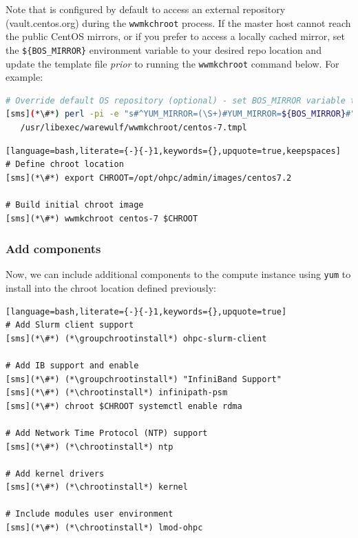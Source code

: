 \documentclass[letterpaper]{article}
\newcommand{\chrootinstall}{yum -y --installroot=\$CHROOT install}
\newcommand{\groupchrootinstall}{yum -y --installroot=\$CHROOT groupinstall}
\begin{document}
\begin{center}
  \begin{tcolorbox}[]
    \small Note that \Warewulf{} is configured by default to access an external repository
    (vault.centos.org) during the \texttt{wwmkchroot} process.
    If the master host cannot reach the public CentOS mirrors, or if you
    prefer to access a locally cached mirror, set the
    \texttt{\$\{BOS\_MIRROR\}} environment variable to your desired repo
    location and update the template file 
    {\em prior} to running the \texttt{wwmkchroot} command below. For
    example:

\begin{lstlisting}[language=bash,keywords={}]
# Override default OS repository (optional) - set BOS_MIRROR variable to desired repo location
[sms](*\#*) perl -pi -e "s#^YUM_MIRROR=(\S+)#YUM_MIRROR=${BOS_MIRROR}#" \
   /usr/libexec/warewulf/wwmkchroot/centos-7.tmpl
\end{lstlisting}

\end{tcolorbox}
\end{center}

\begin{lstlisting}[language=bash,literate={-}{-}1,keywords={},upquote=true,keepspaces]
# Define chroot location 
[sms](*\#*) export CHROOT=/opt/ohpc/admin/images/centos7.2

# Build initial chroot image
[sms](*\#*) wwmkchroot centos-7 $CHROOT
\end{lstlisting}

\subsubsection{Add \OHPC{} components} \label{sec:add_components}



\noindent Now, we can include additional components to the compute instance using
\texttt{yum} to install into the chroot location defined previously:

\begin{lstlisting}[language=bash,literate={-}{-}1,keywords={},upquote=true]
# Add Slurm client support
[sms](*\#*) (*\groupchrootinstall*) ohpc-slurm-client

# Add IB support and enable
[sms](*\#*) (*\groupchrootinstall*) "InfiniBand Support"
[sms](*\#*) (*\chrootinstall*) infinipath-psm
[sms](*\#*) chroot $CHROOT systemctl enable rdma

# Add Network Time Protocol (NTP) support
[sms](*\#*) (*\chrootinstall*) ntp

# Add kernel drivers
[sms](*\#*) (*\chrootinstall*) kernel

# Include modules user environment
[sms](*\#*) (*\chrootinstall*) lmod-ohpc
\end{lstlisting}
\end{document}
